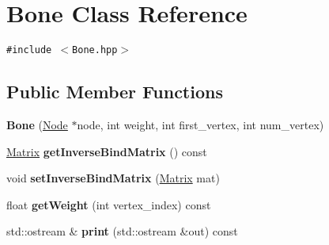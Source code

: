 \hypertarget{classm3g_1_1Bone}{
\section{Bone Class Reference}
\label{classm3g_1_1Bone}
}
{\tt \#include $<$Bone.hpp$>$}

\subsection*{Public Member Functions}
\begin{CompactItemize}
\item 
\hypertarget{classm3g_1_1Bone_62fff0696edaffc0a50a77b4bc4529e9}{
\textbf{Bone} (\hyperlink{classm3g_1_1Node}{Node} $\ast$node, int weight, int first\_\-vertex, int num\_\-vertex)}
\label{classm3g_1_1Bone_62fff0696edaffc0a50a77b4bc4529e9}

\item 
\hypertarget{classm3g_1_1Bone_cc495b3a2c429e933dc04e4498a62935}{
\hyperlink{classm3g_1_1Matrix}{Matrix} \textbf{getInverseBindMatrix} () const }
\label{classm3g_1_1Bone_cc495b3a2c429e933dc04e4498a62935}

\item 
\hypertarget{classm3g_1_1Bone_14956dd171d88884e97c459acfd0fd91}{
void \textbf{setInverseBindMatrix} (\hyperlink{classm3g_1_1Matrix}{Matrix} mat)}
\label{classm3g_1_1Bone_14956dd171d88884e97c459acfd0fd91}

\item 
\hypertarget{classm3g_1_1Bone_f1521ea84960548ee9818ae79289ea8a}{
float \textbf{getWeight} (int vertex\_\-index) const }
\label{classm3g_1_1Bone_f1521ea84960548ee9818ae79289ea8a}

\item 
\hypertarget{classm3g_1_1Bone_6fea17fa1532df3794f8cb39cb4f911f}{
std::ostream \& \textbf{print} (std::ostream \&out) const }
\label{classm3g_1_1Bone_6fea17fa1532df3794f8cb39cb4f911f}

\end{CompactItemize}

